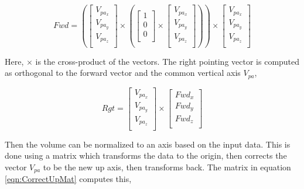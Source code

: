 \begin{equation} \label{eqn:fwdVector}
Fwd = \left(\left[
\begin{array}{c}
V_{pa_{x}}\\
V_{pa_{y}}\\
V_{pa_{z}}\\
\end{array}
\right] \times \left(\left[
\begin{array}{c}
1\\
0\\
0\\
\end{array}
\right] \times \left[
\begin{array}{c}
V_{pa_{x}}\\
V_{pa_{y}}\\
V_{pa_{z}}\\
\end{array}
\right]\right)\right) \times \left[
\begin{array}{c}
V_{pa_{x}}\\
V_{pa_{y}}\\
V_{pa_{z}}\\
\end{array}
\right]
\end{equation}

Here, $\times$ is the cross-product of the vectors. The right pointing vector is computed as orthogonal to the forward vector and the common vertical axis $V_{pa}$,


\begin{equation} \label{eqn:fwdVector}
Rgt = \left[
\begin{array}{c}
V_{pa_{x}}\\
V_{pa_{y}}\\
V_{pa_{z}}\\
\end{array}
\right] \times \left[
\begin{array}{c}
Fwd_x\\
Fwd_y\\
Fwd_z\\
\end{array}
\right]
\end{equation}

Then the volume can be normalized to an axis based on the input data. This is done using a matrix which transforms the data to the origin, then corrects the vector $V_{pa}$ to be the new up axis, then transforms back. The matrix in equation \ref{eqn:CorrectUpMat} computes this,


